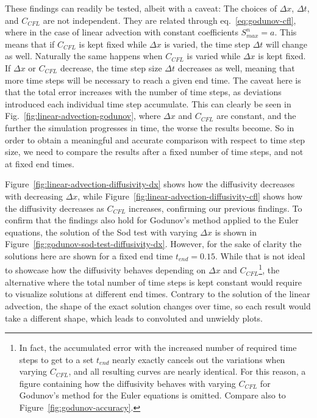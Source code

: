 These findings can readily be tested, albeit with a caveat: The choices of $\Delta x$, $\Delta t$,
and $C_{CFL}$ are not independent. They are related through eq.~\ref{eq:godunov-cfl}, where in the
case of linear advection with constant coefficients $S_{max}^n = a$.
This means that if $C_{CFL}$ is kept fixed while $\Delta x$ is varied, the time step $\Delta t$ will
change as well. Naturally the same happens when $C_{CFL}$ is varied while $\Delta x$ is kept fixed.
If $\Delta x$ or $C_{CFL}$ decrease, the time step size $\Delta t$ decreases as well, meaning that
more time steps will be necessary to reach a given end time. The caveat here is that the total
error increases with the number of time steps, as deviations introduced each individual time step
accumulate. This can clearly be seen in Fig.~\ref{fig:linear-advection-godunov}, where $\Delta x$
and $C_{CFL}$ are constant, and the further the simulation progresses in time, the worse the
results become. So in order to obtain a meaningful and accurate comparison with respect to time
step size, we need to compare the results after a fixed number of time steps, and not at fixed
end times.

Figure~\ref{fig:linear-advection-diffusivity-dx} shows how the diffusivity decreases with decreasing
$\Delta x$, while Figure~\ref{fig:linear-advection-diffusivity-cfl} shows how the diffusivity
decreases as $C_{CFL}$ increases, confirming our previous findings. To confirm that the findings
also hold for Godunov's method applied to the Euler equations, the solution of the Sod test with
varying $\Delta x$ is shown in Figure~\ref{fig:godunov-sod-test-diffusivity-dx}.
However, for the sake of clarity the solutions here are shown for a fixed end time $t_{end} =
0.15$. While that is not ideal to showcase how the diffusivity behaves depending on $\Delta x$ and
$C_{CFL}$\footnote{
In fact, the accumulated error with the increased number of required time steps to get to a set
$t_{end}$ nearly exactly cancels out the variations when varying $C_{CFL}$, and all resulting
curves are nearly identical. For this reason, a figure containing how the diffusivity behaves  with
varying $C_{CFL}$ for Godunov's method for the Euler equations is omitted. Compare also to
Figure~\ref{fig:godunov-accuracy}.
}, the alternative where the total number of time steps is kept constant would
require to visualize solutions at different end times. Contrary to the solution of the linear
advection, the shape of the exact solution changes over time, so each result would take a different
shape, which leads to convoluted and unwieldy plots.










